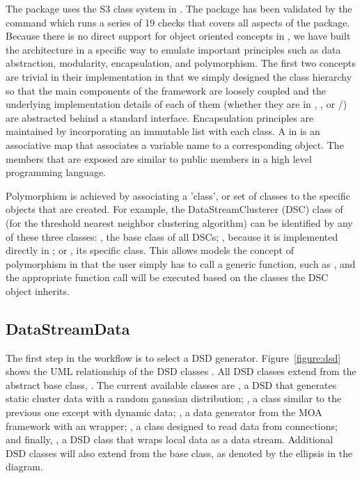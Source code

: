 \documentclass[nojss]{jss}
\begin{document}
The  package uses the S3 class system in . The package has been validated by the command  which runs a series of 19 checks that covers all aspects of the package. Because there is no direct support for object oriented concepts in , we have built the architecture in a specific way to emulate important principles such as data abstraction, modularity, encapsulation, and polymorphism. The first two concepts are trivial in their implementation in that we simply designed the class hierarchy so that the main components of the framework are loosely coupled and the underlying implementation details of each of them (whether they are in , , or /) are abstracted behind a standard  interface. Encapsulation principles are maintained by incorporating an immutable  list with each class. A  in  is an associative map that associates a variable name to a corresponding object. The  members that are exposed are similar to public members in a high level programming language.


Polymorphism is achieved by associating a 'class', or set of classes to the specific objects that are created. For example, the DataStreamClusterer (DSC) class of  (for the threshold nearest neighbor clustering algorithm) can be identified by any of these three classes: , the base class of all DSCs; , because it is implemented directly in ; or , its specific class. This allows models the concept of polymorphism in that the user simply has to call a generic function, such as , and the appropriate function call will be executed based on the classes the DSC object inherits. 

\subsection{DataStreamData}
\label{sec:design:dsd}

The first step in the  workflow is to select a DSD generator. Figure~\ref{figure:dsd} shows the UML relationship of the DSD classes \citep{stream:Fowler:2003}. All DSD classes extend from the abstract base class, . The current available classes are , a DSD that generates static cluster data with a random gaussian distribution; , a class similar to the previous one except with dynamic data; , a data generator from the MOA framework with an  wrapper; , a class designed to read data from  connections; and finally, , a DSD class that wraps local  data as a data stream. Additional DSD classes will also extend from the base class, as denoted by the ellipsis in the diagram.
\end{document}
